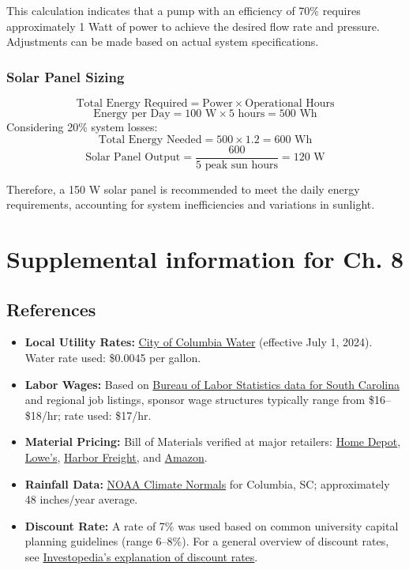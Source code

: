 \documentclass[12pt]{report}
\begin{document}
    This calculation indicates that a pump with an efficiency of 70\% requires approximately 1 Watt of power to achieve the desired flow rate and pressure. Adjustments can be made based on actual system specifications.

    \subsection{Solar Panel Sizing}
    \[
    \text{Total Energy Required} = \text{Power} \times \text{Operational Hours}
    \]
    \[
    \text{Energy per Day} = 100 \text{ W} \times 5 \text{ hours} = 500 \text{ Wh}
    \]
    Considering 20\% system losses:
    \[
    \text{Total Energy Needed} = 500 \times 1.2 = 600 \text{ Wh}
    \]
    \[
    \text{Solar Panel Output} = \frac{600}{5 \text{ peak sun hours}} = 120 \text{ W}
    \]
    
    Therefore, a 150 W solar panel is recommended to meet the daily energy requirements, accounting for system inefficiencies and variations in sunlight.

\chapter{Supplemental information for Ch. 8}
\section{References}
\begin{itemize}
    \item \textbf{Local Utility Rates:}  
    \href{http://www.columbiascwater.net}{City of Columbia Water} (effective July 1, 2024). Water rate used: \$0.0045 per gallon.
    \item \textbf{Labor Wages:}  
    Based on \href{https://www.bls.gov/oes/current/oes_sc.htm}{Bureau of Labor Statistics data for South Carolina} and regional job listings, sponsor wage structures typically range from \$16--\$18/hr; rate used: \$17/hr.
    \item \textbf{Material Pricing:}  
    Bill of Materials verified at major retailers: 
    \href{https://www.homedepot.com/}{Home Depot}, 
    \href{https://www.lowes.com/}{Lowe’s}, 
    \href{https://www.harborfreight.com/}{Harbor Freight}, and 
    \href{https://www.amazon.com/}{Amazon}.
    \item \textbf{Rainfall Data:}  
    \href{https://www.noaa.gov/}{NOAA Climate Normals} for Columbia, SC; approximately 48 inches/year average.
    \item \textbf{Discount Rate:}  
    A rate of 7\% was used based on common university capital planning guidelines (range 6--8\%). For a general overview of discount rates, see \href{https://www.investopedia.com/terms/d/discountrate.asp}{Investopedia's explanation of discount rates}.
\end{itemize}
\end{document}
